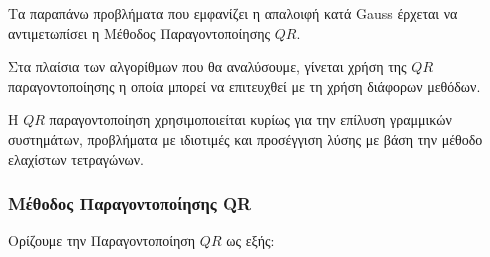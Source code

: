 Τα παραπάνω προβλήματα που εμφανίζει η απαλοιφή κατά \textlatin{Gauss} έρχεται να αντιμετωπίσει η Μέθοδος Παραγοντοποίησης $QR$.

Στα πλαίσια των αλγορίθμων που θα αναλύσουμε, γίνεται χρήση της $QR$ παραγοντοποίησης η οποία μπορεί να επιτευχθεί με τη χρήση διάφορων μεθόδων.

Η $QR$ παραγοντοποίηση χρησιμοποιείται κυρίως για την επίλυση γραμμικών συστημάτων, προβλήματα με ιδιοτιμές και προσέγγιση λύσης με βάση την μέθοδο ελαχίστων τετραγώνων.

\subsubsection{Μέθοδος Παραγοντοποίησης \textlatin{QR}}

Ορίζουμε την Παραγοντοποίηση $QR$ ως εξής:\\


